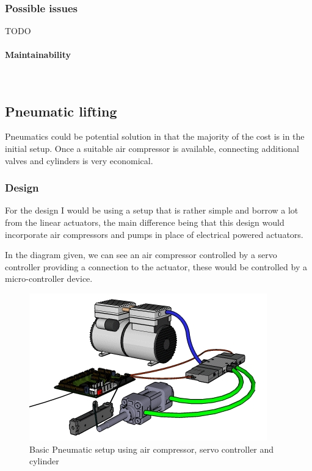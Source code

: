 \documentclass[11pt]{article}
\begin{document}
\subsubsection{Possible issues}
TODO
\paragraph{Maintainability}\mbox{}\\

\subsection{Pneumatic lifting}
Pneumatics could be potential solution in that the majority of the cost is in the initial setup.
Once a suitable air compressor is available, connecting additional valves and cylinders is very economical. 
\subsubsection{Design}
For the design I would be using a setup that is rather simple and borrow a lot from the linear actuators, the main difference
being that this design would incorporate air compressors and pumps in place of electrical powered actuators.

\par

In the diagram given, we can see an air compressor controlled by a servo controller providing a connection to the actuator, these would be controlled by a micro-controller device.

\begin{figure}[H]
  \begin{center}
    \includegraphics{pneSetup}
    
    \caption{Basic Pneumatic setup using air compressor, servo controller and
      cylinder\cite{dnicky}}
  \end{center}
\end{figure}
\end{document}
